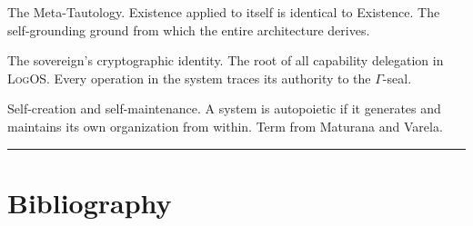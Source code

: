 \documentclass[11pt, oneside]{article}
\newcommand{\LogOS}{\textnormal{\textsc{LogOS}}}
\begin{document}
\begin{description}[leftmargin=1.4em, labelindent=0pt, itemsep=3pt,
                    parsep=0pt, font=\normalfont\bfseries]
\item[$\exists(\exists) \equiv \exists$]
The Meta-Tautology. Existence applied to itself is identical to
Existence. The self-grounding ground from which the entire architecture
derives.

\item[$\Gamma$-Seal]
The sovereign's cryptographic identity. The root of all capability
delegation in \LogOS{}. Every operation in the system traces its
authority to the $\Gamma$-seal.

\item[Autopoiesis]
Self-creation and self-maintenance. A system is autopoietic if it
generates and maintains its own organization from within. Term from
Maturana and Varela.

\end{description}

\vspace{1em}
{\color{LogosGray}\centering\rule{0.45\textwidth}{0.4pt}\par}
\vspace{1em}


\section*{Bibliography}
\end{document}
